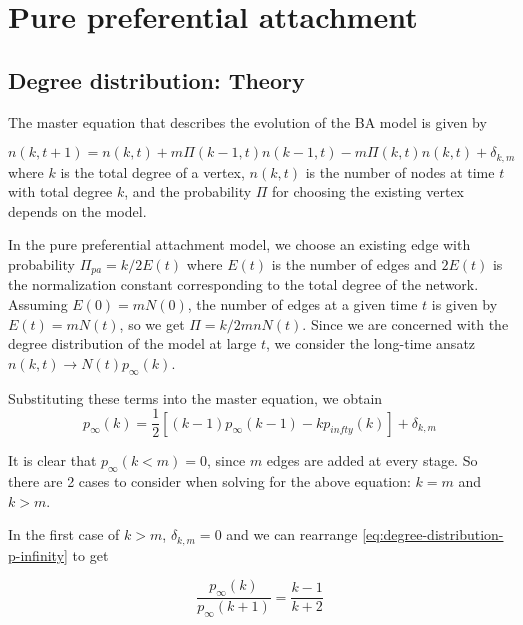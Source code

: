 \section{Pure preferential attachment}\label{section:pure-preferential-attachment}

\subsection{Degree distribution: Theory}\label{subsection:ppa-degree-distribution}
The master equation that describes the evolution of the BA model is given by

\begin{equation}
	n(k, t+1) = n(k, t) + m \Pi(k-1, t)n(k-1, t) - m \Pi(k, t)n(k, t) + \delta_{k,m}
	\label{eq:master}
\end{equation}
where $k$ is the total degree of a vertex, $n(k, t)$ is the number of nodes at time $t$ with total degree $k$, and the probability $\Pi$ for choosing the existing vertex depends on the model. 

In the pure preferential attachment model, we choose an existing edge with probability $\Pi_{pa} = k/ 2E(t)$ where $E(t)$ is the number of edges and $2E(t)$ is the normalization constant corresponding to the total degree of the network. Assuming $E(0) = mN(0)$, the number of edges at a given time $t$ is given by $E(t) = mN(t)$, so we get $\Pi = k / 2mnN(t)$. Since we are concerned with the degree distribution of the model at large $t$, we consider the long-time ansatz $n(k, t) \rightarrow N(t) p_{\infty}(k)$. 

Substituting these terms into the master equation, we obtain 
\begin{equation}
	p_{\infty}(k) = \frac{1}{2}[(k-1)p_{\infty}(k-1) - kp_{infty}(k)] + \delta_{k,m}
	\label{eq:degree-distribution-p-infinity}
\end{equation}

It is clear that $p_{\infty}(k < m) = 0$, since $m$ edges are added at every stage. So there are 2 cases to consider when solving for the above equation: $k = m$ and $k > m$. 

In the first case of $k > m$, $\delta_{k,m} = 0$ and we can rearrange \autoref{eq:degree-distribution-p-infinity} to get

\begin{equation}
	\frac{p_{\infty}(k)}{p_{\infty}(k+1)} = \frac{k-1}{k+2}
	\label{eq:p-infinity-k-greater-m}	
\end{equation}

